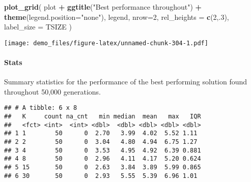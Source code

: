 \documentclass[]{book}
\newenvironment{Shaded}{\begin{snugshade}}{\end{snugshade}}
\newcommand{\DataTypeTok}[1]{\textcolor[rgb]{0.13,0.29,0.53}{#1}}
\newcommand{\DecValTok}[1]{\textcolor[rgb]{0.00,0.00,0.81}{#1}}
\newcommand{\KeywordTok}[1]{\textcolor[rgb]{0.13,0.29,0.53}{\textbf{#1}}}
\newcommand{\NormalTok}[1]{#1}
\newcommand{\OperatorTok}[1]{\textcolor[rgb]{0.81,0.36,0.00}{\textbf{#1}}}
\newcommand{\OtherTok}[1]{\textcolor[rgb]{0.56,0.35,0.01}{#1}}
\newcommand{\StringTok}[1]{\textcolor[rgb]{0.31,0.60,0.02}{#1}}
\let\oldparagraph\paragraph
\renewcommand{\paragraph}[1]{\oldparagraph{#1}\mbox{}}
\begin{document}
\begin{Shaded}
\begin{Highlighting}[]
\KeywordTok{plot_grid}\NormalTok{(}
\NormalTok{  plot }\OperatorTok{+}
\StringTok{    }\KeywordTok{ggtitle}\NormalTok{(}\StringTok{"Best performance throughout"}\NormalTok{) }\OperatorTok{+}
\StringTok{    }\KeywordTok{theme}\NormalTok{(}\DataTypeTok{legend.position=}\StringTok{"none"}\NormalTok{),}
\NormalTok{  legend,}
  \DataTypeTok{nrow=}\DecValTok{2}\NormalTok{,}
  \DataTypeTok{rel_heights =} \KeywordTok{c}\NormalTok{(}\DecValTok{2}\NormalTok{,.}\DecValTok{3}\NormalTok{),}
  \DataTypeTok{label_size =}\NormalTok{ TSIZE}
\NormalTok{)}
\end{Highlighting}
\end{Shaded}

\texttt{[image: demo\_files/figure-latex/unnamed-chunk-304-1.pdf]}

\hypertarget{stats-58}{%
\paragraph{Stats}\label{stats-58}}

Summary statistics for the performance of the best performing solution found throughout 50,000 generations.

\begin{Shaded}
\end{Shaded}

\begin{verbatim}
## # A tibble: 6 x 8
##   K     count na_cnt   min median  mean   max   IQR
##   <fct> <int>  <int> <dbl>  <dbl> <dbl> <dbl> <dbl>
## 1 1        50      0  2.70   3.99  4.02  5.52 1.11 
## 2 2        50      0  3.04   4.80  4.94  6.75 1.27 
## 3 4        50      0  3.53   4.95  4.92  6.39 0.881
## 4 8        50      0  2.96   4.11  4.17  5.20 0.624
## 5 15       50      0  2.63   3.84  3.89  5.99 0.865
## 6 30       50      0  2.93   5.55  5.39  6.96 1.01
\end{verbatim}
\end{document}
